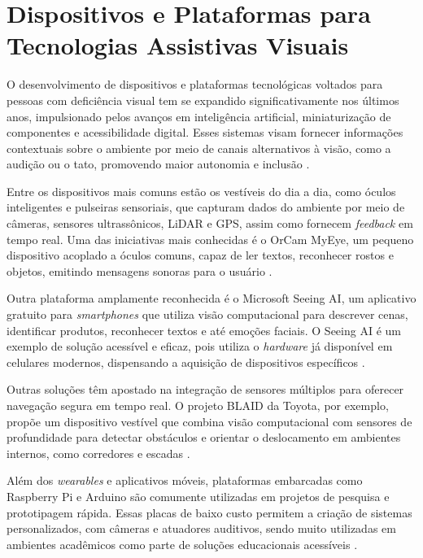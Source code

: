 \section{Dispositivos e Plataformas para Tecnologias Assistivas Visuais}

O desenvolvimento de dispositivos e plataformas tecnológicas voltados para pessoas com deficiência visual tem se expandido significativamente nos últimos anos, impulsionado pelos avanços em inteligência artificial, miniaturização de componentes e acessibilidade digital. Esses sistemas visam fornecer informações contextuais sobre o ambiente por meio de canais alternativos à visão, como a audição ou o tato, promovendo maior autonomia e inclusão \cite{Saeedi2021}.

Entre os dispositivos mais comuns estão os vestíveis do dia a dia, como óculos inteligentes e pulseiras sensoriais, que capturam dados do ambiente por meio de câmeras, sensores ultrassônicos, LiDAR e GPS, assim como fornecem \textit{feedback} em tempo real. Uma das iniciativas mais conhecidas é o OrCam MyEye, um pequeno dispositivo acoplado a óculos comuns, capaz de ler textos, reconhecer rostos e objetos, emitindo mensagens sonoras para o usuário \cite{OrCam2022}.

Outra plataforma amplamente reconhecida é o Microsoft Seeing AI, um aplicativo gratuito para \textit{smartphones} que utiliza visão computacional para descrever cenas, identificar produtos, reconhecer textos e até emoções faciais. O Seeing AI é um exemplo de solução acessível e eficaz, pois utiliza o \textit{hardware} já disponível em celulares modernos, dispensando a aquisição de dispositivos específicos \cite{Microsoft2023}.

Outras soluções têm apostado na integração de sensores múltiplos para oferecer navegação segura em tempo real. O projeto BLAID da Toyota, por exemplo, propõe um dispositivo vestível que combina visão computacional com sensores de profundidade para detectar obstáculos e orientar o deslocamento em ambientes internos, como corredores e escadas \cite{Toyota2018}.

Além dos \textit{wearables} e aplicativos móveis, plataformas embarcadas como Raspberry Pi e Arduino são comumente utilizadas em projetos de pesquisa e prototipagem rápida. Essas placas de baixo custo permitem a criação de sistemas personalizados, com câmeras e atuadores auditivos, sendo muito utilizadas em ambientes acadêmicos como parte de soluções educacionais acessíveis \cite{Pino2020}.

